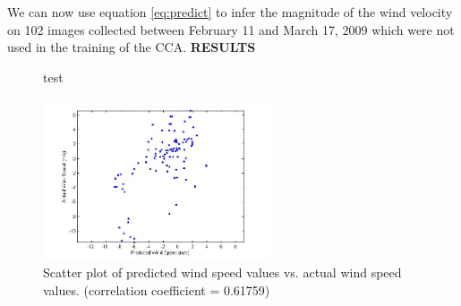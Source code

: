 We can now use equation \ref{eq:predict} to infer the magnitude of the wind velocity on 102 images collected between February 11 and March 17, 2009 which were not used in the training of the CCA. \textbf{RESULTS}
\begin{figure}
	\centering
	\caption{test}
\end{figure}
\begin{figure}
	\centering
		\includegraphics[width=0.60\textwidth]{figures/windspeedcorr.jpg}
	\caption{Scatter plot of predicted wind speed values vs. actual wind speed values. (correlation coefficient = 0.61759)}
	\label{fig:windspeedcorr}
\end{figure}

